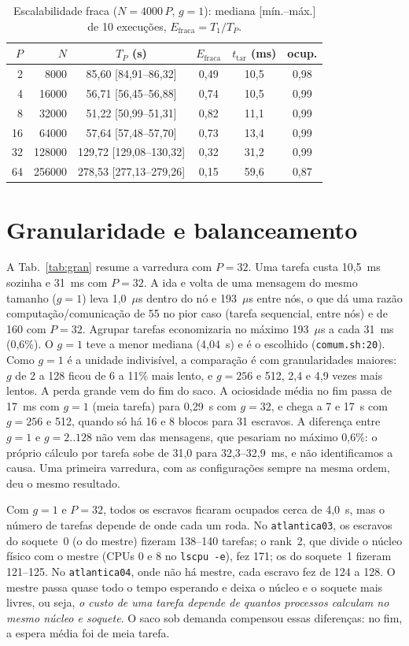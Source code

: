 \documentclass[10pt,a4paper,twocolumn]{article}
\newcommand{\cod}[1]{\texttt{\small #1}}
\begin{document}
\begin{table}[t]
\centering\footnotesize\setlength{\tabcolsep}{3.5pt}
\caption{Escalabilidade fraca ($N=4000\,P$, $g=1$): mediana [mín.--máx.] de 10 execuções,
$E_{\mathrm{fraca}}=T_1/T_P$.}
\label{tab:fraca}
\begin{tabular}{@{}rrcccc@{}}
\toprule
$P$ & $N$ & $T_P$ (s) & $E_{\mathrm{fraca}}$ & $t_{\mathrm{tar}}$ (ms) & ocup. \\
\midrule
2 & 8000 & 85,60 [84,91--86,32] & 0,49 & 10,5 & 0,98 \\
4 & 16000 & 56,71 [56,45--56,88] & 0,74 & 10,5 & 0,99 \\
8 & 32000 & 51,22 [50,99--51,31] & 0,82 & 11,1 & 0,99 \\
16 & 64000 & 57,64 [57,48--57,70] & 0,73 & 13,4 & 0,99 \\
32 & 128000 & 129,72 [129,08--130,32] & 0,32 & 31,2 & 0,99 \\
64 & 256000 & 278,53 [277,13--279,26] & 0,15 & 59,6 & 0,87 \\
\bottomrule
\end{tabular}
\end{table}

\section{Granularidade e balanceamento}
A Tab.~\ref{tab:gran} resume a varredura com $P=32$. Uma tarefa custa 10,5~ms sozinha e 31~ms
com $P=32$. A ida e volta de uma mensagem do mesmo tamanho ($g=1$) leva 1,0~$\mu$s dentro do nó e
193~$\mu$s entre nós, o que dá uma razão computação/comunicação de 55 no pior caso (tarefa
sequencial, entre nós) e de 160 com $P=32$. Agrupar tarefas economizaria no máximo 193~$\mu$s a cada
31~ms (0,6\%). O $g=1$ teve a menor mediana (4,04~s) e é o escolhido (\cod{comum.sh:20}).
Como $g=1$ é a unidade indivisível, a comparação é com granularidades maiores: $g$ de 2 a 128
ficou de 6 a 11\% mais lento, e $g=256$ e 512, 2,4 e 4,9 vezes mais lentos. A perda grande vem
do fim do saco. A ociosidade média no fim passa de 17~ms com $g=1$ (meia tarefa) para 0,29~s
com $g=32$, e chega a 7 e 17~s com $g=256$ e 512, quando só há 16 e 8 blocos para 31 escravos.
A diferença entre $g=1$ e $g=2..128$ não vem das mensagens, que pesariam no máximo 0,6\%: o
próprio cálculo por tarefa sobe de 31,0 para 32,3--32,9~ms, e não identificamos a causa. Uma
primeira varredura, com as configurações sempre na mesma ordem, deu o mesmo resultado.

Com $g=1$ e $P=32$, todos os escravos ficaram ocupados cerca de 4,0~s, mas o número de tarefas
depende de onde cada um roda. No \cod{atlantica03}, os escravos do soquete~0 (o do mestre)
fizeram 138--140 tarefas; o rank~2, que divide o núcleo físico com o mestre (CPUs 0 e 8 no
\cod{lscpu -e}), fez 171; os do soquete~1 fizeram 121--125. No \cod{atlantica04}, onde não há
mestre, cada escravo fez de 124 a 128. O mestre passa quase todo o tempo esperando e deixa o
núcleo e o soquete mais livres, ou seja, \emph{o custo de uma tarefa depende de quantos
processos calculam no mesmo núcleo e soquete}. O saco sob demanda compensou essas diferenças:
no fim, a espera média foi de meia tarefa.
\end{document}
